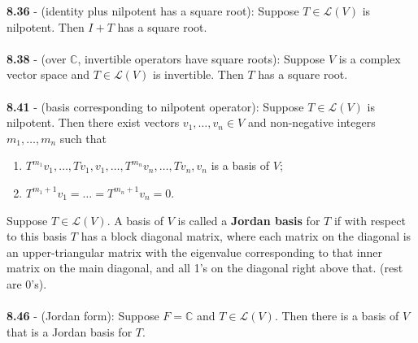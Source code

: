 \documentclass{article}
\theoremstyle{definition}
\begin{document}
\textbf{8.36} - (identity plus nilpotent has a square root): Suppose $T \in \mathcal{L}(V)$ is nilpotent. Then $I + T$ has a square root. \\ \\
\textbf{8.38} - (over $\mathbb{C}$, invertible operators have square roots): Suppose $V$ is a complex vector space and $T \in \mathcal{L}(V)$ is invertible. Then $T$ has a square root. \\ \\
\textbf{8.41} - (basis corresponding to nilpotent operator): Suppose $T \in \mathcal{L}(V)$ is nilpotent. Then there exist vectors $v_1, \dots, v_n \in V$ and non-negative integers $m_1, \dots, m_n$ such that \begin{enumerate}
    \item $T^{m_1}v_1, \dots, Tv_1, v_1, \dots, T^{m_n}v_n, \dots, Tv_n, v_n$ is a basis of $V$;
    \item $T^{m_1 + 1}v_1 = \dots = T^{m_n + 1}v_n = 0$.
\end{enumerate} $ $ \\
Suppose $T \in \mathcal{L}(V)$. A basis of $V$ is called a \textbf{Jordan basis} for $T$ if with respect to this basis $T$ has a block diagonal matrix, where each matrix on the diagonal is an upper-triangular matrix with the eigenvalue corresponding to that inner matrix on the main diagonal, and all 1's on the diagonal right above that. (rest are 0's). \\ \\
\textbf{8.46} - (Jordan form): Suppose $F = \mathbb{C}$ and $T \in \mathcal{L}(V)$. Then there is a basis of $V$ that is a Jordan basis for $T$. \\ \\
\end{document}
